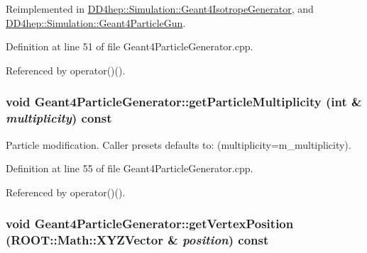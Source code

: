 Reimplemented in \hyperlink{class_d_d4hep_1_1_simulation_1_1_geant4_isotrope_generator_af4fcebcc7a5e4c13a458200d03b07f33}{DD4hep::Simulation::Geant4IsotropeGenerator}, and \hyperlink{class_d_d4hep_1_1_simulation_1_1_geant4_particle_gun_a38c98b33bbe2f7064bce8c9f4345f262}{DD4hep::Simulation::Geant4ParticleGun}.

Definition at line 51 of file Geant4ParticleGenerator.cpp.

Referenced by operator()().\hypertarget{class_d_d4hep_1_1_simulation_1_1_geant4_particle_generator_a11e2509ffa4cbdb3abceaf71706d7093}{
\subsubsection[{getParticleMultiplicity}]{\setlength{\rightskip}{0pt plus 5cm}void Geant4ParticleGenerator::getParticleMultiplicity (int \& {\em multiplicity}) const}}
\label{class_d_d4hep_1_1_simulation_1_1_geant4_particle_generator_a11e2509ffa4cbdb3abceaf71706d7093}


Particle modification. Caller presets defaults to: (multiplicity=m\_\-multiplicity). 

Definition at line 55 of file Geant4ParticleGenerator.cpp.

Referenced by operator()().\hypertarget{class_d_d4hep_1_1_simulation_1_1_geant4_particle_generator_a45b2aea5eeb5e76e14b01f297198dcd6}{
\subsubsection[{getVertexPosition}]{\setlength{\rightskip}{0pt plus 5cm}void Geant4ParticleGenerator::getVertexPosition (ROOT::Math::XYZVector \& {\em position}) const}}
\label{class_d_d4hep_1_1_simulation_1_1_geant4_particle_generator_a45b2aea5eeb5e76e14b01f297198dcd6}


